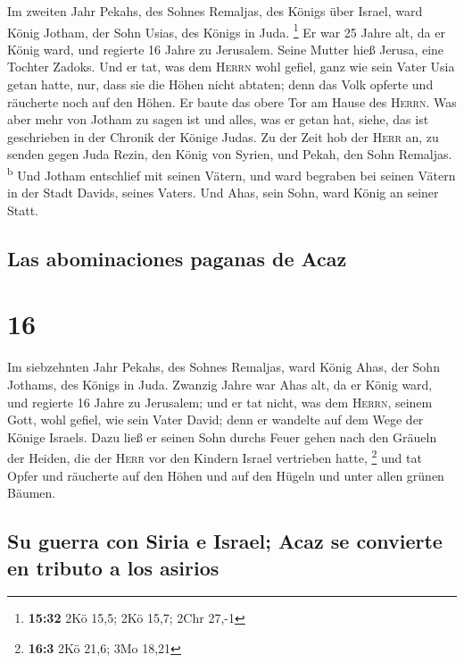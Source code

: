  Im zweiten Jahr Pekahs, des Sohnes Remaljas, des Königs
über Israel, ward König Jotham, der Sohn Usias, des Königs in Juda.
\footnote{\textbf{15:32} 2Kö 15,5; 2Kö 15,7; 2Chr 27,-1} 
Er war 25 Jahre alt, da er König ward, und regierte 16 Jahre zu
Jerusalem. Seine Mutter hieß Jerusa, eine Tochter Zadoks.
 Und er tat, was dem \textsc{Herrn} wohl gefiel, ganz wie
sein Vater Usia getan hatte,  nur, dass sie die Höhen
nicht abtaten; denn das Volk opferte und räucherte noch auf den Höhen.
Er baute das obere Tor am Hause des \textsc{Herrn}.  Was
aber mehr von Jotham zu sagen ist und alles, was er getan hat, siehe,
das ist geschrieben in der Chronik der Könige Judas.  Zu
der Zeit hob der \textsc{Herr} an, zu senden gegen Juda Rezin, den König
von Syrien, und Pekah, den Sohn Remaljas. \textsuperscript{b}
 Und Jotham entschlief mit seinen Vätern, und ward
begraben bei seinen Vätern in der Stadt Davids, seines Vaters.
 Und Ahas, sein Sohn, ward König an seiner Statt.

\hypertarget{las-abominaciones-paganas-de-acaz}{%
\subsection{Las abominaciones paganas de
Acaz}\label{las-abominaciones-paganas-de-acaz}}

\hypertarget{section-15}{%
\section{16}\label{section-15}}

 Im siebzehnten Jahr Pekahs, des Sohnes Remaljas, ward
König Ahas, der Sohn Jothams, des Königs in Juda.  Zwanzig
Jahre war Ahas alt, da er König ward, und regierte 16 Jahre zu
Jerusalem; und er tat nicht, was dem \textsc{Herrn}, seinem Gott, wohl
gefiel, wie sein Vater David;  denn er wandelte auf dem
Wege der Könige Israels. Dazu ließ er seinen Sohn durchs Feuer gehen
nach den Gräueln der Heiden, die der \textsc{Herr} vor den Kindern
Israel vertrieben hatte, \footnote{\textbf{16:3} 2Kö 21,6; 3Mo 18,21}
 und tat Opfer und räucherte auf den Höhen und auf den
Hügeln und unter allen grünen Bäumen.

\hypertarget{su-guerra-con-siria-e-israel-acaz-se-convierte-en-tributo-a-los-asirios}{%
\subsection{Su guerra con Siria e Israel; Acaz se convierte en tributo a
los
asirios}\label{su-guerra-con-siria-e-israel-acaz-se-convierte-en-tributo-a-los-asirios}}

